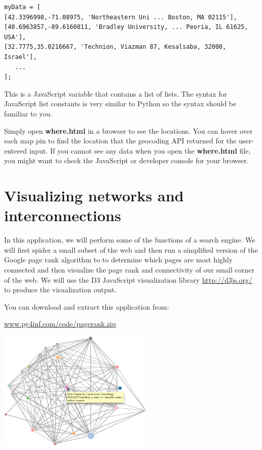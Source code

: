 \documentclass[11pt]{book}
\begin{document}
\beforeverb
\begin{verbatim}
myData = [
[42.3396998,-71.08975, 'Northeastern Uni ... Boston, MA 02115'],
[40.6963857,-89.6160811, 'Bradley University, ... Peoria, IL 61625, USA'],
[32.7775,35.0216667, 'Technion, Viazman 87, Kesalsaba, 32000, Israel'],
   ...
];
\end{verbatim}
\afterverb
%
This is a JavaScript variable that contains a list of lists.  
The syntax for JavaScript list constants is very similar to 
Python so the syntax should be familiar to you.

Simply open {\bf where.html} in a browser to see the locations.  You 
can hover over each map pin to find the location that the 
geocoding API returned for the user-entered input.  If you 
cannot see any data when you open the {\bf where.html} file, you might 
want to check the JavaScript or developer console for your browser.

\section{Visualizing networks and interconnections}

In this application, we will perform some of the functions of a search
engine.   We will first spider a small subset of the web and then run
a simplified version of the Google page rank algorithm to
to determine which pages are most highly connected and then visualize
the page rank and connectivity of our small corner of the web.
We will use the D3 JavaScript visualization library 
\url{http://d3js.org/} to produce the visualization output.

You can download and extract this application from:

\url{www.py4inf.com/code/pagerank.zip}

\beforefig
\centerline{\includegraphics[height=2.25in]{figs2/pagerank.eps}}
\afterfig
\end{document}
